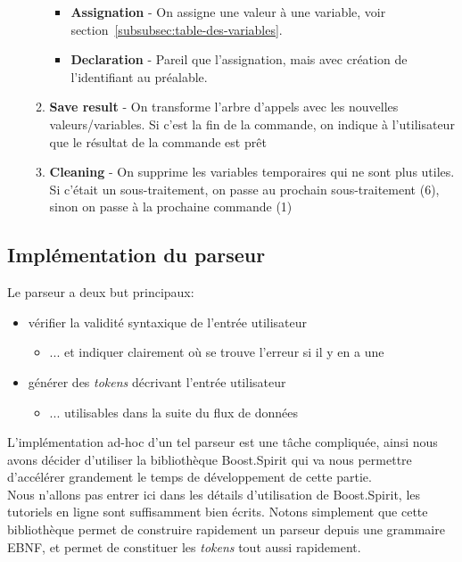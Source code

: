 \documentclass[french]{article}
\begin{document}
\begin{enumerate}
\begin{enumerate}
\begin{itemize}
					\item \textbf{Assignation} - On assigne une valeur à une variable, voir section~\ref{subsubsec:table-des-variables}.
					\item \textbf{Declaration} - Pareil que l'assignation, mais avec création de l'identifiant au préalable.
				\end{itemize}
				\item \textbf{Save result} - On transforme l'arbre d'appels avec les nouvelles valeurs/variables. Si c'est la fin de la commande, on indique à l'utilisateur que le résultat de la commande est prêt
				\item \textbf{Cleaning} - On supprime les variables temporaires qui ne sont plus utiles. Si c'était un sous-traitement, on passe au prochain sous-traitement (6), sinon on passe à la prochaine commande (1)
			\end{enumerate}
		\end{enumerate}
		
		\subsection{Implémentation du parseur}
		\label{subsec:implementation-du-parseur}
		Le parseur a deux but principaux:
		
		\begin{itemize}
			\item vérifier la validité syntaxique de l'entrée utilisateur
			\begin{itemize}
				\item ... et indiquer clairement où se trouve l'erreur si il y en a une
			\end{itemize}
			\item générer des \textit{tokens} décrivant l'entrée utilisateur
			\begin{itemize}
				\item ... utilisables dans la suite du flux de données\\
			\end{itemize}
		\end{itemize}
		
		L'implémentation ad-hoc d'un tel parseur est une tâche compliquée, ainsi nous avons décider d'utiliser la bibliothèque Boost.Spirit \cite{boost.spirit} qui va nous permettre d'accélérer grandement le temps de développement de cette partie.\\
		
		Nous n'allons pas entrer ici dans les détails d'utilisation de Boost.Spirit, les tutoriels en ligne sont suffisamment bien écrits. Notons simplement que cette bibliothèque permet de construire rapidement un parseur depuis une grammaire EBNF, et permet de constituer les \textit{tokens} tout aussi rapidement.\\
		
\end{document}
